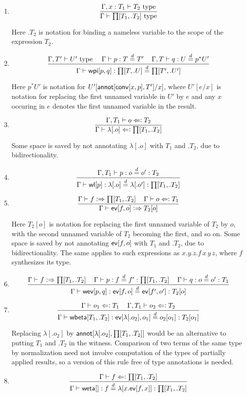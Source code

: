 \documentclass[11pt]{article}
\newcommand{\eqd}{\stackrel{d}{=}}
\newcommand{\spc}{{\,\,\,\,\,\,\,}}
\newcommand{\synth}{\vcentcolon\Rightarrow}
\newcommand{\force}{\Leftarrow\vcentcolon}
\newcommand{\Type}{\mathop{{\, \rm type}}}
\newcommand{\ha}[2]{#1[#2]}
\newcommand{\weta}{{\sf weta}}
\newcommand{\annot}{{\sf annot}}
\newcommand{\conv}{{\sf conv}}
\newcommand{\ev}{{\sf ev}}
\newcommand{\wbeta}{{\sf wbeta}}
\newcommand{\wev}{{\sf wev}}
\newcommand{\wl}{{\sf wl}}
\newcommand{\wpi}{{\sf wpi}}
\begin{document}
\begin{enumerate}

\item 
$$\frac{\Gamma, x:T_1\vdash T_2\Type}{\Gamma\vdash \ha\prod{T_1,.T_2}\Type}$$

Here $.T_2$ is notation for binding a nameless variable to the scope of the expression $T_2$.

\item 
$$ \frac{ 
  \Gamma, T' \vdash U'  \Type      \spc 
  \Gamma     \vdash p:T \eqd T'    \spc
  \Gamma, T  \vdash q:U \eqd p^*U'
  } {
  \Gamma     \vdash \ha\wpi{p,q}:\ha\prod{T,.U}\eqd \ha\prod{T',.U'}
}$$

Here ${p}^*U'$ is notation for $U'[\ha\annot{\ha\conv{x,p},T'}/x]$,
where $U'[e/x]$ is notation for replacing the first unnamed variable in
$U'$ by $e$ and any $x$ occuring in $e$ denotes the first unnamed variable in
the result.

\item 
$$\frac{\Gamma, T_1\vdash o \force T_2}{\Gamma\vdash \ha\lambda{.o} \force \ha\prod{T_1,.T_2}}$$

Some space is saved by not annotating $\ha\lambda{.o}$ with $T_1$ and $.T_2$, due to bidirectionality.

\item 
$$\frac{\Gamma, T_1\vdash p : o\eqd o' : T_2}{\Gamma\vdash \ha\wl{p} : \ha\lambda{.o}\eqd \ha\lambda{.o'} : \ha\prod{T_1,.T_2}}$$

\item 
$$\frac{\Gamma\vdash f \synth \ha\prod{T_1,.T_2}\spc \Gamma\vdash o \force T_1}{\Gamma\vdash \ha\ev{f,o} \synth T_2[o]}$$

Here $T_2[o]$ is notation for replacing the first unnamed variable of
$T_2$ by $o$, with the second unnamed variable of $T_2$ becoming the first, and
so on.  Some space is saved by not annotating $\ha\ev{f,o}$ with $T_1$ and
$.T_2$, due to bidirectionality.  The same applies to such expressions as
$x.y.z.f\, x\, y\, z$, where $f$ synthesizes its type.

\item 
$$\frac{\Gamma\vdash f \synth \ha\prod{T_1,.T_2} \spc \Gamma\vdash p : f \eqd f' : \ha\prod{T_1,.T_2}\spc \Gamma\vdash q : o \eqd o' : T_1}{\Gamma\vdash \ha\wev{p,q} : \ha\ev{f,o} \eqd \ha\ev{f',o'} : T_2[o]}$$

\item 
$$\frac{ \Gamma\vdash o_1 \force T_1\spc \Gamma, T_1\vdash o_2 \force T_2}{\Gamma\vdash \ha\wbeta{T_1,.T_2} : \ha\ev{\ha\lambda{.o_2},o_1} \eqd o_2[o_1] : T_2[o_1]}$$

Replacing $\ha\lambda{.o_2}$ by
$\ha\annot{\ha\lambda{.o_2},\ha\prod{T_1,.T_2}}$ would be an alternative to
putting $T_1$ and $.T_2$ in the witness.  Comparison of two terms of the same
type by normalization need not involve computation of the types of partially
applied results, so a version of this rule free of type annotations is needed.

\item 
$$\frac{\Gamma\vdash f \force \ha\prod{T_1,.T_2}}{\Gamma\vdash \ha\weta{} : f \eqd \ha\lambda{x.\ha\ev{f,x}} : \ha\prod{T_1,.T_2}}$$ 

\end{enumerate}



\end{document}
